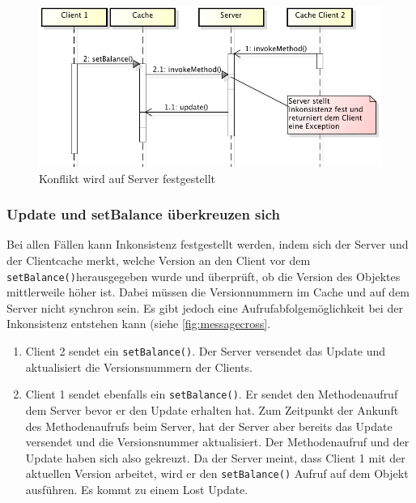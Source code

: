 \begin{figure}[h]
  \centering
\includegraphics[scale=0.3]{images_objectcaching/conflictOnServer}  
  \caption{Konflikt wird auf Server festgestellt}
  \label{fig:conflictonserver}
\end{figure}

\subsubsection{Update und setBalance überkreuzen sich}
\label{sec:update-und-set}

Bei allen Fällen kann Inkonsistenz festgestellt werden, indem sich der Server und der Clientcache merkt, welche Version an den Client vor dem \verb|setBalance()|herausgegeben wurde und überprüft, ob die Version des Objektes mittlerweile höher ist. Dabei müssen die Versionnummern im Cache und auf dem Server nicht synchron sein. Es gibt jedoch eine Aufrufabfolgemöglichkeit bei der Inkonsistenz entstehen kann (siehe \ref{fig:messagecross}.

\begin{enumerate}
\item Client 2 sendet ein \verb|setBalance()|. Der Server versendet das Update und aktualisiert die Versionsnummern der Clients.
\item Client 1 sendet ebenfalls ein \verb|setBalance()|. Er sendet den Methodenaufruf dem Server bevor er den Update erhalten hat. Zum Zeitpunkt der Ankunft des Methodenaufrufs beim Server, hat der Server aber bereits das Update versendet und die Versionsnummer aktualisiert. Der Methodenaufruf und der Update haben sich also gekreuzt. Da der Server meint, dass Client 1 mit der aktuellen Version arbeitet, wird er den \verb|setBalance()| Aufruf auf dem Objekt ausführen. Es kommt zu einem Lost Update.
\end{enumerate}

